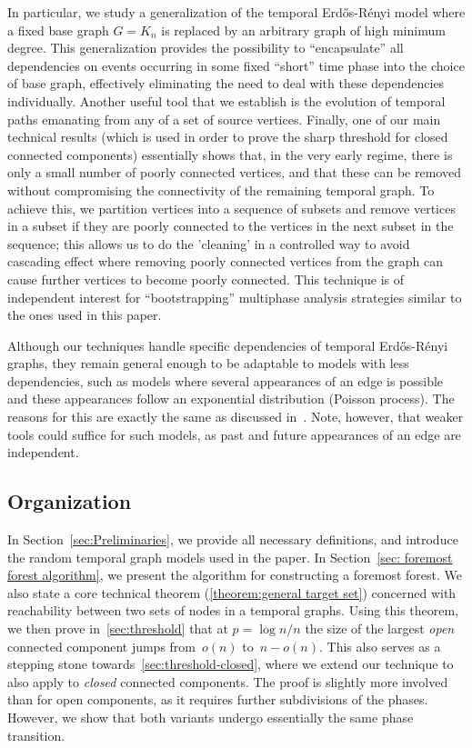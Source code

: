 \documentclass[a4paper,11pt]{article}
\theoremstyle{definition}
\theoremstyle{plain}
\newcommand{\Erdos}{Erd\H{o}s}
\newcommand{\Renyi}{R\'enyi}
\newcommand{\ER}{\Erdos-\Renyi}
\begin{document}
In particular, we study a generalization of the temporal \ER{} model 
where a fixed base graph $G = K_n$ is replaced by an arbitrary graph of high minimum degree.
This generalization provides the possibility to ``encapsulate'' all dependencies on events occurring in some fixed ``short'' time phase into the choice of base graph, effectively eliminating the need to deal with these dependencies individually.
Another useful tool that we establish is the evolution of temporal paths
emanating from any of a set of source vertices.
Finally, one of our main technical results (which is used in order to prove the sharp threshold for closed connected components) essentially shows that, in the very early regime, there is only a small number of poorly connected vertices, and that these can be removed without compromising the connectivity of the remaining temporal graph. 
To achieve this, we partition vertices into a sequence of subsets and remove 
vertices in a subset if they are poorly connected to the vertices in the next subset in the sequence; this allows us to do the 'cleaning' in a controlled way to avoid cascading effect 
where removing poorly connected vertices from the graph can cause further vertices to become poorly connected.
This technique is of independent interest for ``bootstrapping'' multiphase analysis strategies similar to the ones used in this paper.


Although our techniques handle specific dependencies of temporal \ER{} graphs, they remain general enough to be adaptable to models with less dependencies, such as models where several appearances of an edge is possible and these appearances follow an exponential distribution (Poisson process). The reasons for this are exactly the same as discussed in~\cite{CasteigtsRRZ21}. Note, however, that weaker tools could suffice for such models, as past and future appearances of an edge are independent.




\subsection{Organization}


In Section~\ref{sec:Preliminaries}, we provide all necessary definitions, and introduce the random temporal graph models used in the paper.
In Section~\ref{sec: foremost forest algorithm}, we present the algorithm for constructing a foremost forest.
We also state a core technical theorem (\cref{theorem:general target set}) concerned with reachability between two sets of nodes in a temporal graphs.
Using this theorem, we then prove in~\cref{sec:threshold} that at $p = \log n/n$ the size of the largest \emph{open} connected component jumps from~$o(n)$ to~$n-o(n)$.
This also serves as a stepping stone towards~\cref{sec:threshold-closed}, where we extend our technique to also apply to \emph{closed} connected components. The proof is slightly more involved than for open components, as it requires further subdivisions of the phases. However, we show that both variants undergo essentially the same phase transition. 
\end{document}
